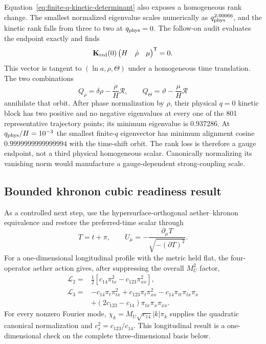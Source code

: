 Equation~\eqref{eq:finite-q-kinetic-determinant} also exposes a homogeneous
rank change.  The smallest normalized eigenvalue scales numerically as
$q_{\rm phys}^{2.00066}$, and the kinetic rank falls from three to two at
$q_{\rm phys}=0$.  The follow-on audit evaluates the endpoint exactly and
finds
\begin{equation}
 \mathbf K_{\rm red}(0)
 \begin{pmatrix}H&\dot\rho&\mu\end{pmatrix}^{\mathsf T}=0.
 \label{eq:low-q-time-shift-null}
\end{equation}
This vector is tangent to $(\ln a,\rho,\Theta)$ under a homogeneous time
translation.  The two combinations
\begin{equation}
 Q_\rho=\delta\rho-\frac{\dot\rho}{H}\mathcal R,
 \qquad
 Q_\Theta=\vartheta-\frac{\mu}{H}\mathcal R
 \label{eq:low-q-invariants}
\end{equation}
annihilate that orbit.  After phase normalization by $\rho$, their physical
$q=0$ kinetic block has two positive and no negative eigenvalues at every one
of the 801 representative trajectory points; its minimum eigenvalue is
$0.937286$.  At $q_{\rm phys}/H=10^{-3}$ the smallest finite-$q$ eigenvector
has minimum alignment cosine $0.9999999999999994$ with the time-shift orbit.
The rank loss is therefore a gauge endpoint, not a third physical homogeneous
scalar.  Canonically normalizing its vanishing norm would manufacture a
gauge-dependent strong-coupling scale.

\subsection{Bounded khronon cubic readiness result}

As a controlled next step, use the hypersurface-orthogonal aether--khronon equivalence \cite{jacobson2010} and restore the preferred-time scalar through
\begin{equation}
 T=t+\pi,\qquad
 U_\mu=-\frac{\partial_\mu T}{\sqrt{-(\partial T)^2}}.
 \label{eq:khronon-definition}
\end{equation}
For a one-dimensional longitudinal profile with the metric held flat, the
four-operator aether action gives, after suppressing the overall $M_U^2$
factor,
\begin{align}
 \mathcal L_2={}&\frac12\left[c_{14}\pi_{tx}^2
                 -c_{123}\pi_{xx}^2\right],\label{eq:khronon-l2}\\
 \mathcal L_3={}&-c_{14}\pi_t\pi_{tx}^2
 +c_{123}\pi_t\pi_{xx}^2-c_{14}\pi_{tt}\pi_{tx}\pi_x\nonumber\\
 &+(2c_{123}-c_{14})\pi_{tx}\pi_x\pi_{xx}.
 \label{eq:khronon-l3}
\end{align}
For every nonzero Fourier mode,
$\chi_k=M_U\sqrt{c_{14}}\lvert k\rvert\pi_k$ supplies the quadratic canonical
normalization and $c_s^2=c_{123}/c_{14}$.  This longitudinal result is a
one-dimensional check on the complete three-dimensional basis below.

